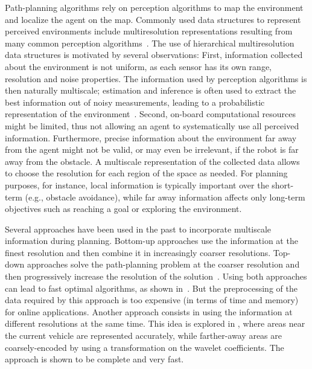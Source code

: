 \documentclass[letterpaper, 10 pt, conference]{ieeeconf}
\theoremstyle{definition}
\begin{document}
Path-planning algorithms rely on perception algorithms to map the environment and localize the agent on the map. Commonly used data structures to represent perceived environments include multiresolution representations resulting from many common perception algorithms~\cite{endres3,octomap2010}.
The use of hierarchical multiresolution data structures is motivated by several observations:
First, information collected about the environment is not uniform, as each sensor has its own range, resolution and noise properties.
The information used by perception algorithms is then naturally multiscale; estimation and inference is often used
to extract the best information out of noisy measurements, leading to a probabilistic representation of the environment~\cite{octomap2010}.
Second, on-board computational resources might be limited, thus not allowing an agent to systematically use all perceived information. Furthermore, precise information about the environment far away from the agent might not be valid, or may even be irrelevant,
if the robot is far away from the obstacle.
A multiscale representation of the collected data allows to choose the resolution for each region of the space as needed.
For planning purposes, for instance, local information is typically important over the short-term (e.g., obstacle avoidance),
while far away information affects only long-term objectives such as reaching a goal or exploring the environment.



Several approaches have been used in the past to incorporate multiscale information during  planning.
Bottom-up approaches use the information at the finest resolution and then combine it in increasingly coarser  resolutions. 
Top-down approaches solve the path-planning problem at the coarser resolution and then progressively increase the resolution of the solution~\cite{kambhampati1986multiresolution,pai1998multiresolution}.
Using both approaches can lead to fast optimal algorithms, as shown in~\cite{lu2010beamlet}.
But the preprocessing of the data required by this approach is too expensive (in terms of time and memory) for online applications.
Another approach consists in using the information at different resolutions at the same time. This idea is explored in \cite{cowlagi2011hierarchical},
where areas near the current vehicle are represented accurately, while farther-away areas are coarsely-encoded
by using a transformation on the wavelet coefficients. The approach is shown to be complete and very fast.
\end{document}
